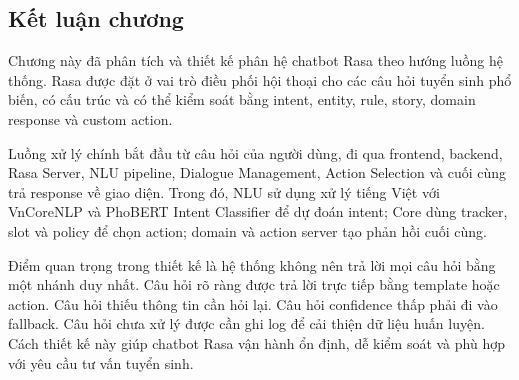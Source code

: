 \subsection{Kết luận chương}

Chương này đã phân tích và thiết kế phân hệ chatbot Rasa theo hướng luồng hệ thống. Rasa được đặt ở vai trò điều phối hội thoại cho các câu hỏi tuyển sinh phổ biến, có cấu trúc và có thể kiểm soát bằng intent, entity, rule, story, domain response và custom action.

Luồng xử lý chính bắt đầu từ câu hỏi của người dùng, đi qua frontend, backend, Rasa Server, NLU pipeline, Dialogue Management, Action Selection và cuối cùng trả response về giao diện. Trong đó, NLU sử dụng xử lý tiếng Việt với VnCoreNLP và PhoBERT Intent Classifier để dự đoán intent; Core dùng tracker, slot và policy để chọn action; domain và action server tạo phản hồi cuối cùng.

Điểm quan trọng trong thiết kế là hệ thống không nên trả lời mọi câu hỏi bằng một nhánh duy nhất. Câu hỏi rõ ràng được trả lời trực tiếp bằng template hoặc action. Câu hỏi thiếu thông tin cần hỏi lại. Câu hỏi confidence thấp phải đi vào fallback. Câu hỏi chưa xử lý được cần ghi log để cải thiện dữ liệu huấn luyện. Cách thiết kế này giúp chatbot Rasa vận hành ổn định, dễ kiểm soát và phù hợp với yêu cầu tư vấn tuyển sinh.

